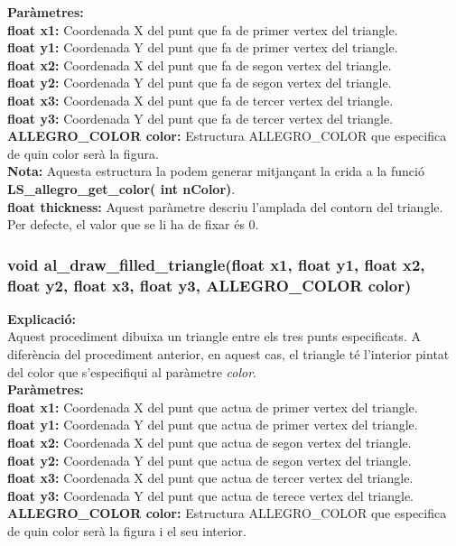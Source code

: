 \documentclass[11pt]{article}
\begin{document}
\noindent \textbf{Paràmetres:}\\
\textbf{float x1:} Coordenada X del punt que fa de primer vertex del triangle.\\
\textbf{float y1:} Coordenada Y del punt que fa de primer vertex del triangle.\\
\textbf{float x2:} Coordenada X del punt que fa de segon vertex del triangle.\\
\textbf{float y2:} Coordenada Y del punt que fa de segon vertex del triangle.\\
\textbf{float x3:} Coordenada X del punt que fa de tercer vertex del triangle.\\
\textbf{float y3:} Coordenada Y del punt que fa de tercer vertex del triangle.\\
\textbf{ALLEGRO\_COLOR color:} Estructura ALLEGRO\_COLOR que especifica de quin color serà la figura.\\
 
\noindent \textbf{Nota:} Aquesta estructura la podem generar mitjançant la crida a la funció \textbf{LS\_allegro\_get\_color( int nColor)}.\\

\noindent\textbf{float thickness:} Aquest paràmetre descriu l'amplada del contorn del triangle. Per defecte, el valor que se li ha de fixar és 0.\\

\newpage		
\subsubsection{void al\_draw\_filled\_triangle(float x1, float y1, float x2, float y2, float x3, float y3, ALLEGRO\_COLOR color)}
\textbf{Explicació:}\\
Aquest procediment dibuixa un triangle entre els tres punts especificats. A diferència del procediment anterior, en aquest cas, el triangle té l'interior pintat del color que s'especifiqui al paràmetre \textit{color}.\\

\noindent \textbf{Paràmetres:}\\
\textbf{float x1:} Coordenada X del punt que actua de primer vertex del triangle.\\
\textbf{float y1:} Coordenada Y del punt que actua de primer vertex del triangle.\\
\textbf{float x2:} Coordenada X del punt que actua de segon vertex del triangle.\\
\textbf{float y2:} Coordenada Y del punt que actua de segon vertex del triangle.\\
\textbf{float x3:} Coordenada X del punt que actua de tercer vertex del triangle.\\
\textbf{float y3:} Coordenada Y del punt que actua de terece vertex del triangle.\\
\textbf{ALLEGRO\_COLOR color:} Estructura ALLEGRO\_COLOR que especifica de quin color serà la figura i el seu interior.\\
\end{document}
